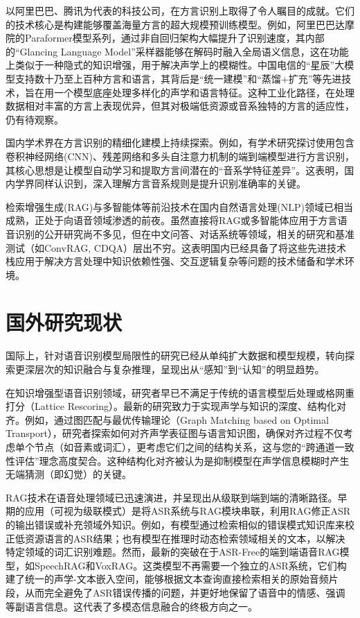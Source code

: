 以阿里巴巴、腾讯为代表的科技公司，在方言识别上取得了令人瞩目的成就。它们的技术核心是构建能够覆盖海量方言的超大规模预训练模型。例如，阿里巴巴达摩院的Paraformer模型系列，通过非自回归架构大幅提升了识别速度，其内部的“Glancing Language Model”采样器能够在解码时融入全局语义信息，这在功能上类似于一种隐式的知识增强，用于解决声学上的模糊性。中国电信的“星辰”大模型支持数十乃至上百种方言和语言，其背后是“统一建模”和“蒸馏+扩充”等先进技术，旨在用一个模型底座处理多样化的声学和语言特征。这种工业化路径，在处理数据相对丰富的方言上表现优异，但其对极端低资源或音系独特的方言的适应性，仍有待观察。

国内学术界在方言识别的精细化建模上持续探索。例如，有学术研究探讨使用包含卷积神经网络(CNN)、残差网络和多头自注意力机制的端到端模型进行方言识别，其核心思想是让模型自动学习和提取方言间潜在的“音系学特征差异”。这表明，国内学界同样认识到，深入理解方言音系规则是提升识别准确率的关键。

检索增强生成(RAG)与多智能体等前沿技术在国内自然语言处理(NLP)领域已相当成熟，正处于向语音领域渗透的前夜。虽然直接将RAG或多智能体应用于方言语音识别的公开研究尚不多见，但在中文问答、对话系统等领域，相关的研究和基准测试（如ConvRAG, CDQA）层出不穷。这表明国内已经具备了将这些先进技术栈应用于解决方言处理中知识依赖性强、交互逻辑复杂等问题的技术储备和学术环境。


\section{国外研究现状}

国际上，针对语音识别模型局限性的研究已经从单纯扩大数据和模型规模，转向探索更深层次的知识融合与复杂推理，呈现出从“感知”到“认知”的明显趋势。

在知识增强型语音识别领域，研究者早已不满足于传统的语言模型后处理或格网重打分（Lattice Rescoring）。最新的研究致力于实现声学与知识的深度、结构化对齐。例如，通过图匹配与最优传输理论（Graph Matching based on Optimal Transport），研究者探索如何对齐声学表征图与语言知识图，确保对齐过程不仅考虑单个节点（如音素或词汇），更考虑它们之间的结构关系，这与您的“跨通道一致性评估”理念高度契合。这种结构化对齐被认为是抑制模型在声学信息模糊时产生无端猜测（即幻觉）的关键。

RAG技术在语音处理领域已迅速演进，并呈现出从级联到端到端的清晰路径。早期的应用（可视为级联模式）是将ASR系统与RAG模块串联，利用RAG修正ASR的输出错误或补充领域外知识。例如，有模型通过检索相似的错误模式知识库来校正低资源语言的ASR结果；也有模型在推理时动态检索领域相关的文本，以解决特定领域的词汇识别难题。然而，最新的突破在于ASR-Free的端到端语音RAG模型，如SpeechRAG和VoxRAG。这类模型不再需要一个独立的ASR系统，它们构建了统一的声学-文本嵌入空间，能够根据文本查询直接检索相关的原始音频片段，从而完全避免了ASR错误传播的问题，并更好地保留了语音中的情感、强调等副语言信息。这代表了多模态信息融合的终极方向之一。

